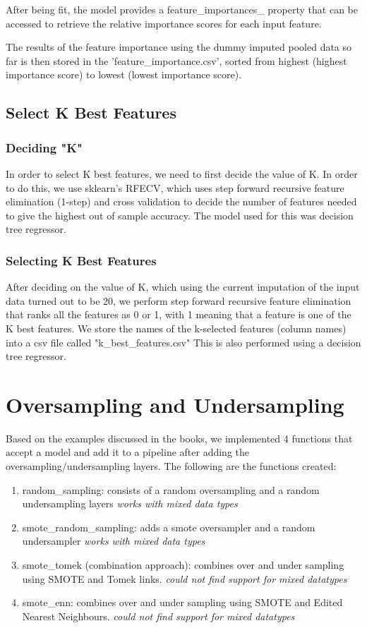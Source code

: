 \documentclass{article}
\begin{document}
After being fit, the model provides a feature\_importances\_ property that can be accessed to retrieve the relative importance scores for each input feature.

The results of the feature importance using the dummy imputed pooled data so far is then stored in the 'feature\_importance.csv', sorted from highest (highest importance score) to lowest (lowest importance score).

\subsection{Select K Best Features}
\subsubsection{Deciding "K"}
In order to select K best features, we need to first decide the value of K. In order to do this, we use sklearn's RFECV, which uses step forward recursive feature elimination (1-step) and cross validation to decide the number of features needed to give the highest out of sample accuracy. The model used for this was decision tree regressor.

\subsubsection{Selecting K Best Features}
After deciding on the value of K, which using the current imputation of the input data turned out to be 20, we perform step forward recursive feature elimination that ranks all the features as 0 or 1, with 1 meaning that a feature is one of the K best features. We store the names of the k-selected features (column names) into a csv file called "k\_best\_features.csv" This is also performed using a decision tree regressor.

\section{Oversampling and Undersampling}
Based on the examples discussed in the books, we implemented 4 functions that accept a model and add it to a pipeline after adding the oversampling/undersampling layers. The following are the functions created:

\begin{enumerate}
    \item random\_sampling: consists of a random oversampling and a random undersampling layers \textit{works with mixed data types}
    \item smote\_random\_sampling: adds a smote oversampler and a random undersampler \textit{works with mixed data types}
    \item smote\_tomek (combination approach): combines over and under sampling using SMOTE and Tomek links. \textit{could not find support for mixed datatypes}
    \item smote\_enn: combines over and under sampling using SMOTE and Edited Nearest Neighbours. \textit{could not find support for mixed datatypes}
\end{enumerate}
\end{document}
